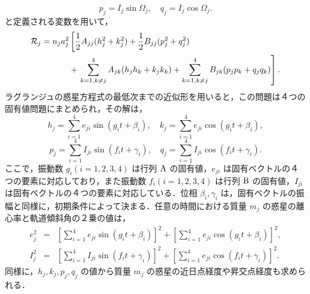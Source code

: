 \documentclass[11pt,a4paper,oneside,onecolumn]{jreport}
\begin{document}
\begin{equation}
p_j = I_j \sin \Omega_j, \quad q_j = I_j \cos \Omega_j.
\end{equation}
と定義される変数を用いて，
\begin{equation}
\begin{split}
{\cal R}_j = n_j a_j^2 & \left[ \frac{1}{2} A_{jj} (h_j^2 + k_j^2) + \frac{1}{2} B_{jj} (p_j^2 + q_j^2) \right. \\
& + \left. \sum_{k = 1, k \not= j}^4 A_{jk} (h_j h_k + k_j k_k) + \sum_{k = 1, k \not= j}^4 B_{jk} (p_j p_k + q_j q_k) \right]. \\
\end{split} \label{}
\end{equation}
ラグランジュの惑星方程式の最低次までの近似形を用いると，この問題は４つの固有値問題にまとめられ，その解は，
\begin{equation}
h_j = \sum_{i = 1}^4 e_{ji} \sin (g_i t + \beta_i), \quad k_j = \sum_{i=1}^4 e_{ji} \cos (g_i t + \beta_i), \label{}
\end{equation}
\begin{equation}
p_j = \sum_{i = 1}^4 I_{ji} \sin (f_i t + \gamma_i), \quad q_j = \sum_{i=1}^4 I_{ji} \cos (f_i t + \gamma_i). \label{}
\end{equation}
ここで，振動数 $g_i (i = 1, 2, 3, 4)$ は行列 ${\rm A}$ の固有値，$e_{ji}$ は固有ベクトルの４つの要素に対応しており，また振動数 $f_i (i = 1, 2, 3, 4)$ は行列 ${\rm B}$ の固有値，$I_{ji}$ は固有ベクトルの４つの要素に対応している．位相 $\beta_i, \gamma_i$ は，固有ベクトルの振幅と同様に，初期条件によって決まる．任意の時間における質量 $m_j$ の惑星の離心率と軌道傾斜角の２乗の値は，
\begin{eqnarray}
e_j^2 & = & \left[ \sum_{i = 1}^4 e_{ji} \sin (g_i t + \beta_i) \right]^2 + \left[ \sum_{i = 1}^4 e_{ji} \cos (g_i t + \beta_i) \right]^2, \\
I_j^2 & = & \left[ \sum_{i = 1}^4 I_{ji} \sin (f_i t + \gamma_i) \right]^2 + \left[ \sum_{i = 1}^4 e_{ji} \cos (f_i t + \gamma_i) \right]^2.
\end{eqnarray}
同様に，$h_j, k_j, p_j, q_j$ の値から質量 $m_j$ の惑星の近日点経度や昇交点経度も求められる．
\end{document}
